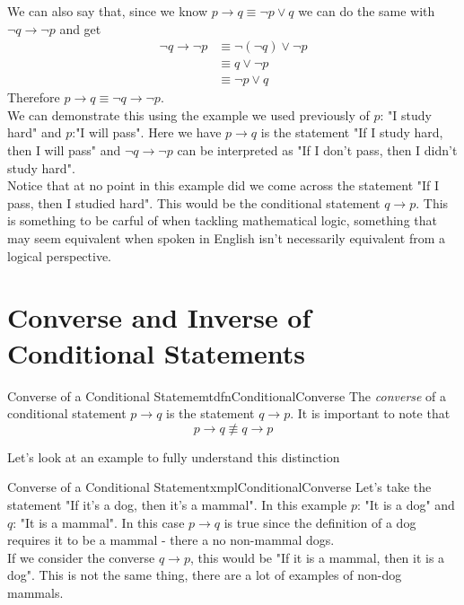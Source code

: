 We can also say that, since we know $p \to q \equiv \lnot p \lor q$ we can do the same with $\lnot q \to \lnot p$ and get
\begin{align*}
    \lnot q \to \lnot p & \equiv \lnot (\lnot q) \lor \lnot p          \\
                        & \equiv q \lor \lnot p \tag*{Double Negation} \\
                        & \equiv \lnot p \lor q
\end{align*}
Therefore $p \to q \equiv \lnot q \to \lnot p$.\\

We can demonstrate this using the example we used previously of $p$: "I study hard" and $p$:"I will pass". Here we have $p \to q$ is the statement "If I study hard, then I will pass" and $\lnot q \to \lnot p$ can be interpreted as "If I don't pass, then I didn't study hard".\\

Notice that at no point in this example did we come across the statement "If I pass, then I studied hard". This would be the conditional statement $q \to p$. This is something to be carful of when tackling mathematical logic, something that may seem equivalent when spoken in English isn't necessarily equivalent from a logical perspective.

\section{Converse and Inverse of Conditional Statements}

\begin{dfn}[label={def:conditionalConverse}]{Converse of a Conditional Statememt}{dfnConditionalConverse}
    The \emph{converse} of a conditional statement $p \to q$ is the statement $q \to p$. It is important to note that
    $$p \to q \not \equiv q \to p$$
\end{dfn}

Let's look at an example to fully understand this distinction

\begin{exmpl}[label={exmpl:conditionalConverse}]{Converse of a Conditional Statement}{xmplConditionalConverse}
    Let's take the statement "If it's a dog, then it's a mammal". In this example $p$: "It is a dog" and $q$: "It is a mammal". In this case $p \to q$ is true since the definition of a dog requires it to be a mammal - there a no non-mammal dogs.\\

    If we consider the converse $q \to p$, this would be "If it is a mammal, then it is a dog". This is not the same thing, there are a lot of examples of non-dog mammals.
\end{exmpl}

